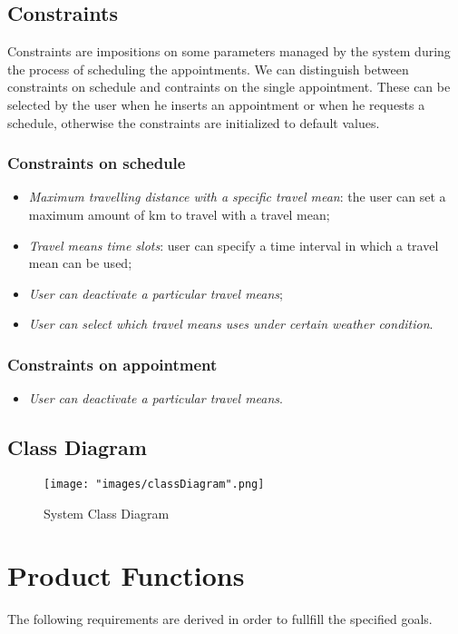 \subsection{Constraints}
Constraints are impositions on some parameters managed by the system during the process of scheduling the appointments. We can distinguish between constraints on schedule and contraints on the single appointment. These can be selected by the user when he inserts an appointment or when he requests a schedule, otherwise the constraints are initialized to default values. 

\subsubsection{Constraints on schedule} 
\begin{itemize}
\item \textit{Maximum travelling distance with a specific travel mean}: the user can set a maximum amount of km to travel with a travel mean;
\item\textit{ Travel means time slots}: user can specify a time interval in which a travel mean can be used;
\item \textit{User can deactivate a particular travel means};
\item \textit{User can select which travel means uses under certain weather condition}.
\end{itemize}

\subsubsection{Constraints on appointment}
\begin{itemize}
\item \textit{User can deactivate a particular travel means}.
\end{itemize}

\subsection{Class Diagram}
\begin{figure}[H]
\begin{center}
\texttt{[image: "images/classDiagram".png]}
\caption{System Class Diagram}
\end{center}
\end{figure}

\section{Product Functions}
The following requirements are derived in order to fullfill the specified goals.
\\

